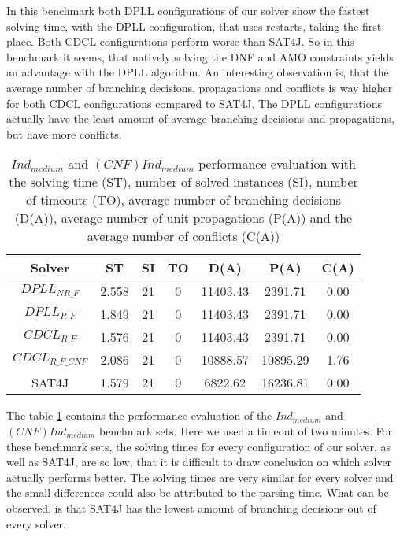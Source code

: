 In this benchmark both DPLL configurations of our solver show the fastest solving time, with the DPLL configuration, that uses restarts, taking the first place. Both CDCL configurations perform worse than SAT4J. So in this benchmark it seems, that natively solving the DNF and AMO constraints yields an advantage with the DPLL algorithm. An interesting observation is, that the average number of branching decisions, propagations and conflicts is way higher for both CDCL configurations compared to SAT4J. The DPLL configurations actually have the least amount of average branching decisions and propagations, but have more conflicts.

\begin{table}[!htb]
\centering
\caption[$Ind_{medium}$ and $(CNF)Ind_{medium}$ performance evaluation]{$Ind_{medium}$ and $(CNF)Ind_{medium}$ performance evaluation with the solving time (ST), number of solved instances (SI), number of timeouts (TO), average number of branching decisions (D(A)), average number of unit propagations (P(A)) and the average number of conflicts (C(A))}
\label{tab:jBenchmarks}
\begin{tabular}{|c|c|c|c|c|c|c|}
\hline
Solver & ST & SI & TO & D(A) & P(A) & C(A)\\ 
\hline
$DPLL_{NR\_F}$ & 2.558 & 21 & 0 & 11403.43 & 2391.71 & 0.00 \\ 
\hline
$DPLL_{R\_F}$ & 1.849 & 21 & 0 & 11403.43 & 2391.71 & 0.00 \\ 
\hline
$CDCL_{R\_F}$ & 1.576 & 21 & 0 & 11403.43 & 2391.71 & 0.00 \\ 
\hline
$CDCL_{R\_F\_CNF}$ & 2.086 & 21 & 0 & 10888.57 & 10895.29 & 1.76 \\ 
\hline
SAT4J & 1.579 & 21 & 0 & 6822.62 & 16236.81 & 0.00 \\ 
\hline
\end{tabular}
\end{table}

The table \ref{tab:jBenchmarks} contains the performance evaluation of the $Ind_{medium}$ and $(CNF)Ind_{medium}$ benchmark sets. Here we used a timeout of two minutes. For these benchmark sets, the solving times for every configuration of our solver, as well as SAT4J, are so low, that it is difficult to draw conclusion on which solver actually performs better. The solving times are very similar for every solver and the small differences could also be attributed to the parsing time. What can be observed, is that SAT4J has the lowest amount of branching decisions out of every solver.

